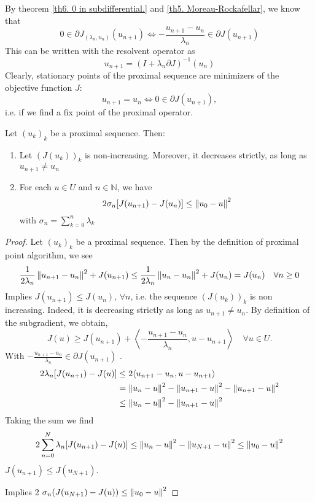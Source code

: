 By theorem \ref{th6. 0 in subdifferential.} and \ref{th5. Moreau-Rockafellar}, we know that
\[
	0 \in \partial J_{(\lambda_n, u_n)}(u_{n+1}) \iff -\frac{u_{n+1}-u_n}{\lambda_n} \in \partial J(u_{n+1})
\]
This can be written with the resolvent operator as
\[
	u_{n+1}=(I+\lambda_n \partial J)^{-1} (u_n)
\]
Clearly, stationary points of the proximal sequence are minimizers of the objective function $J$:
\[
	u_{n+1}=u_n \iff 0 \in \partial J(u_{n+1}),
\]
i.e. if we find a fix point of the proximal operator.
\begin{lemma}
	\label{lemma11. Proximal sequence.}
	Let $(u_k)_k$ be a proximal sequence. Then:
	\begin{enumerate}
		\item Let $(J(u_k))_k$ is non-increasing. Moreover, it decreases strictly, as long as $u_{n+1} \neq u_n$
		\item For each $u\in U$ and $n\in \mathbb{N}$, we have 
		\[
			2 \sigma_n [J(u_{n+1})-J(u_n)] \leq \left\lVert u_0 - u \right\rVert^2
		\]
		with $\sigma_n = \sum_{k=0}^{n} \lambda_k$
	\end{enumerate}
	\begin{proof}
		Let $(u_k)_k$ be a proximal sequence. Then by the definition of proximal point algorithm, we see
		\[
			\frac{1}{2\lambda_n}\left\lVert u_{n+1}-u_n\right\rVert^2 + J(u_{n+1}) \leq \frac{1}{2\lambda_n}\left\lVert u_{n}-u_n\right\rVert^2 + J(u_{n}) = J(u_n) \quad \forall n \geq 0
		\]
		Implies $J(u_{n+1}) \leq J(u_n)$, $\forall n$, i.e. the sequence $(J(u_k))_k$ is non increasing. Indeed, it is decreasing strictly as long as $u_{n+1}\neq u_{n}$.
		By definition of the subgradient, we obtain,
		\begin{equation*}
			J(u) \geq J(u_{n+1}) + \left\langle -\frac{u_{n+1}-u_n}{\lambda_n} , u-u_{n+1} \right\rangle  \quad \forall u \in U.
		\end{equation*}
		With $-\frac{u_{n+1}-u_n}{\lambda_n} \in \partial J(u_{n+1})$ .
		\begin{align*}
			2\lambda_n [J(u_{n+1})-J(u)] &\leq 2 \langle u_{n+1}-u_n, u-u_{n+1}\rangle \\
			&= \left\lVert u_n-u\right\rVert^2 -\left\lVert u_{n+1}-u\right\rVert^2 -\left\lVert u_{n+1}-u\right\rVert^2 \\
			&\leq \left\lVert u_n-u\right\rVert^2 - \left\lVert u_{n+1}-u\right\rVert^2
		\end{align*}
		Taking the sum we find
		\begin{align}
			2\sum_{n=0}^{N} \lambda_n [J(u_{n+1})-J(u)] \leq \left\lVert u_n-u\right\rVert^2 - \left\lVert u_{N+1}-u\right\rVert^2 \leq \left\lVert u_0 - u\right\rVert^2
		\end{align}
		$J(u_{n+1}) \leq J(u_{N+1}) $.
		
		Implies 2 $\sigma_n (J(u_{N+1})-J(u)) \leq \left\lVert u_0 - u\right\rVert^2$
	\end{proof}
\end{lemma}

